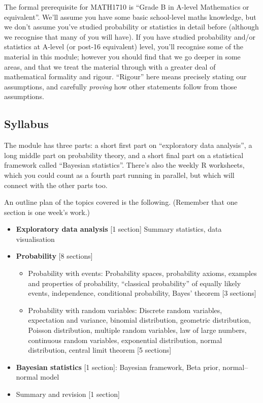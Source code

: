 \documentclass[
  a4paper,
]{book}
\providecommand{\tightlist}{%
  \setlength{\itemsep}{0pt}\setlength{\parskip}{0pt}}
\theoremstyle{definition}
\theoremstyle{definition}
\theoremstyle{definition}
\theoremstyle{definition}
\theoremstyle{remark}
\begin{document}
The formal prerequisite for MATH1710 is ``Grade B in A-level Mathematics or equivalent''. We'll assume you have some basic school-level maths knowledge, but we don't assume you've studied probability or statistics in detail before (although we recognise that many of you will have). If you have studied probability and/or statistics at A-level (or post-16 equivalent) level, you'll recognise some of the material in this module; however you should find that we go deeper in some areas, and that we treat the material through with a greater deal of mathematical formality and rigour. ``Rigour'' here means precisely stating our assumptions, and carefully \emph{proving} how other statements follow from those assumptions.

\hypertarget{syllabus}{%
\subsection*{Syllabus}\label{syllabus}}

The module has three parts: a short first part on ``exploratory data analysis'', a long middle part on probability theory, and a short final part on a statistical framework called ``Bayesian statistics''. There's also the weekly R worksheets, which you could count as a fourth part running in parallel, but which will connect with the other parts too.

An outline plan of the topics covered is the following. (Remember that one section is one week's work.)

\begin{itemize}
\tightlist
\item
  \textbf{Exploratory data analysis} {[}1 section{]} Summary statistics, data visualisation
\item
  \textbf{Probability} {[}8 sections{]}

  \begin{itemize}
  \tightlist
  \item
    Probability with events: Probability spaces, probability axioms, examples and properties of probability, ``classical probability'' of equally likely events, independence, conditional probability, Bayes' theorem {[}3 sections{]}
  \item
    Probability with random variables: Discrete random variables, expectation and variance, binomial distribution, geometric distribution, Poisson distribution, multiple random variables, law of large numbers, continuous random variables, exponential distribution, normal distribution, central limit theorem {[}5 sections{]}
  \end{itemize}
\item
  \textbf{Bayesian statistics} {[}1 section{]}: Bayesian framework, Beta prior, normal--normal model
\item
  Summary and revision {[}1 section{]}
\end{itemize}
\end{document}
